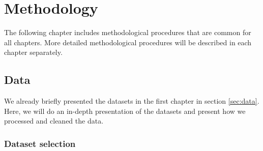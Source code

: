 
\chapter{Methodology} %
\label{chapter3} 

The following chapter includes methodological procedures that are common for all chapters.
More detailed methodological procedures will be described in each chapter separately. 

\section{Data}

We already briefly presented the datasets in the first chapter in section \ref{sec:data}.
Here, we will do an in-depth presentation of the datasets and present how we processed and cleaned the data. 

\subsection{Dataset selection}

